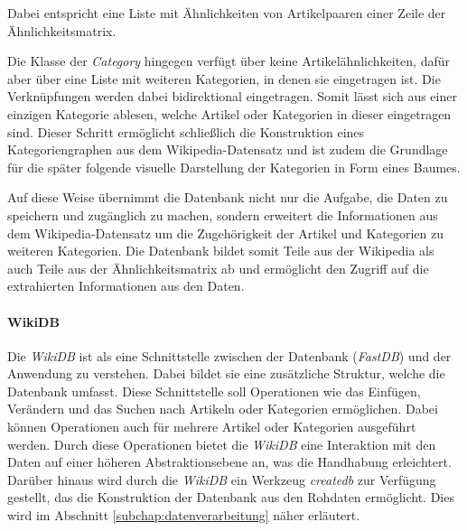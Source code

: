 Dabei entspricht eine Liste mit Ähnlichkeiten von Artikelpaaren einer Zeile der Ähnlichkeitsmatrix.

Die Klasse der \emph{Category} hingegen verfügt über keine Artikelähnlichkeiten, dafür aber über eine Liste mit weiteren Kategorien, in denen sie eingetragen ist.
Die Verknüpfungen werden dabei bidirektional eingetragen.
Somit lässt sich aus einer einzigen Kategorie ablesen, welche Artikel oder Kategorien in dieser eingetragen sind.
Dieser Schritt ermöglicht schließlich die Konstruktion eines Kategoriengraphen aus dem Wikipedia-Datensatz und ist zudem die Grundlage für die später folgende visuelle Darstellung der Kategorien in Form eines Baumes.

Auf diese Weise übernimmt die Datenbank nicht nur die Aufgabe, die Daten zu speichern und zugänglich zu machen, sondern erweitert die Informationen aus dem Wikipedia-Datensatz um die Zugehörigkeit der Artikel und Kategorien zu weiteren Kategorien.
Die Datenbank bildet somit Teile aus der Wikipedia als auch Teile aus der Ähnlichkeitsmatrix ab und ermöglicht den Zugriff auf die extrahierten Informationen aus den Daten.

\paragraph{WikiDB}
Die \emph{WikiDB} ist als eine Schnittstelle zwischen der Datenbank (\emph{FastDB}) und der Anwendung zu verstehen. 
Dabei bildet sie eine zusätzliche Struktur, welche die Datenbank umfasst.
Diese Schnittstelle soll Operationen wie das Einfügen, Verändern und das Suchen nach Artikeln oder Kategorien ermöglichen.
Dabei können Operationen auch für mehrere Artikel oder Kategorien ausgeführt werden.
Durch diese Operationen bietet die \emph{WikiDB} eine Interaktion mit den Daten auf einer höheren Abstraktionsebene an, was die Handhabung erleichtert.
Darüber hinaus wird durch die \emph{WikiDB} ein Werkzeug \emph{createdb} zur Verfügung gestellt, das die Konstruktion der Datenbank aus den Rohdaten ermöglicht.
Dies wird im Abschnitt \ref{subchap:datenverarbeitung} näher erläutert.


